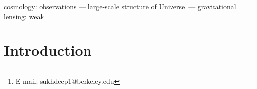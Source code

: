 \documentclass[a4paper,fleqn,usenatbib]{mnras}
\title[]{}
\author[S.~Singh et al.]{
   Sukhdeep Singh$^{1,2}$\thanks{E-mail: sukhdeep1@berkeley.edu},
\\
   $^{1}$ Berkeley Center for Cosmological Physics, Department of Physics, University of California, Berkeley, CA 94720, USA\\
   $^{2}$Lawrence Berkeley National Laboratory (LBNL),
Physics Division, Berkeley, CA 94720-8153, USA\\
}
\date{Accepted XXX. Received YYY; in original form ZZZ}
\begin{document}
\label{firstpage}
\pagerange{\pageref{firstpage}--\pageref{lastpage}}
\maketitle

\begin{abstract}
\end{abstract}

\begin{keywords}
cosmology: observations
  --- large-scale structure of Universe\ --- gravitational
  lensing: weak
\end{keywords}

\section{Introduction}
\end{document}
